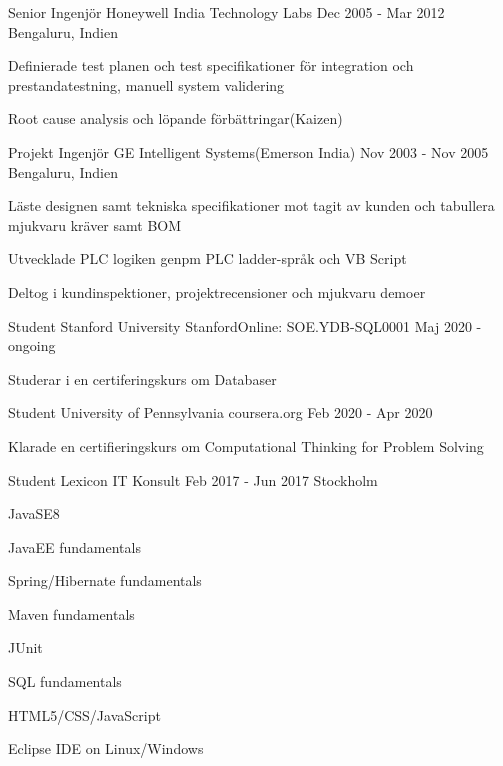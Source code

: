 \documentclass[12pt, a4paper]{awesome-cv}
\begin{document}
\begin{cventries}
    \cventry
      {Senior Ingenjör}
      {Honeywell India Technology Labs}
      {Dec 2005 - Mar 2012}
      {Bengaluru, Indien}
      {
        \begin{cvitems}
        \item Definierade test planen och test specifikationer för integration och prestandatestning, manuell system validering
        \item Root cause analysis och löpande förbättringar(Kaizen)
        \end{cvitems}
      }

    \cventry
      {Projekt Ingenjör}
      {GE Intelligent Systems(Emerson India)}
      {Nov 2003 - Nov 2005}
      {Bengaluru, Indien}
      {
        \begin{cvitems}
        \item Läste designen samt tekniska specifikationer mot tagit av kunden och tabullera mjukvaru kräver samt BOM 
        \item Utvecklade PLC logiken genpm PLC ladder-språk och VB Script
        \item Deltog i kundinspektioner, projektrecensioner och mjukvaru demoer
        \end{cvitems}
      }
  \end{cventries}


  \begin{cventries}
    \cventry
    {Student}
      {Stanford University}
      {StanfordOnline: SOE.YDB-SQL0001}
      {Maj 2020 - ongoing}
      {
        \begin{cvitems}
        \item {Studerar i en certiferingskurs om Databaser}
        \end{cvitems}
      }

    \cventry
      {Student}
      {University of Pennsylvania}
      {coursera.org}
      {Feb 2020 - Apr 2020}
      {
        \begin{cvitems}
        \item {Klarade en certifieringskurs om Computational Thinking for Problem Solving}
        \end{cvitems}
      }

    \cventry
      {Student}
      {Lexicon IT Konsult}
      {Feb 2017 - Jun 2017}
      {Stockholm}
      {
        \begin{cvitems}
          \item JavaSE8
          \item JavaEE fundamentals
          \item Spring/Hibernate fundamentals
          \item Maven fundamentals
          \item JUnit
          \item SQL fundamentals
          \item HTML5/CSS/JavaScript
          \item Eclipse IDE on Linux/Windows
           \end{cvitems}
      }
    \end{cventries}
\end{document}
